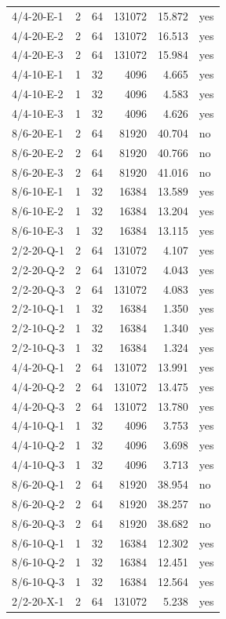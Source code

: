\begin{longtable}{lrrrrl}
4/4-20-E-1 & 2 & 64 & 131072 & 15.872 & yes \\
4/4-20-E-2 & 2 & 64 & 131072 & 16.513 & yes \\
4/4-20-E-3 & 2 & 64 & 131072 & 15.984 & yes \\
4/4-10-E-1 & 1 & 32 & 4096 & 4.665 & yes \\
4/4-10-E-2 & 1 & 32 & 4096 & 4.583 & yes \\
4/4-10-E-3 & 1 & 32 & 4096 & 4.626 & yes \\
8/6-20-E-1 & 2 & 64 & 81920 & 40.704 & no \\
8/6-20-E-2 & 2 & 64 & 81920 & 40.766 & no \\
8/6-20-E-3 & 2 & 64 & 81920 & 41.016 & no \\
8/6-10-E-1 & 1 & 32 & 16384 & 13.589 & yes \\
8/6-10-E-2 & 1 & 32 & 16384 & 13.204 & yes \\
8/6-10-E-3 & 1 & 32 & 16384 & 13.115 & yes \\
2/2-20-Q-1 & 2 & 64 & 131072 & 4.107 & yes \\
2/2-20-Q-2 & 2 & 64 & 131072 & 4.043 & yes \\
2/2-20-Q-3 & 2 & 64 & 131072 & 4.083 & yes \\
2/2-10-Q-1 & 1 & 32 & 16384 & 1.350 & yes \\
2/2-10-Q-2 & 1 & 32 & 16384 & 1.340 & yes \\
2/2-10-Q-3 & 1 & 32 & 16384 & 1.324 & yes \\
4/4-20-Q-1 & 2 & 64 & 131072 & 13.991 & yes \\
4/4-20-Q-2 & 2 & 64 & 131072 & 13.475 & yes \\
4/4-20-Q-3 & 2 & 64 & 131072 & 13.780 & yes \\
4/4-10-Q-1 & 1 & 32 & 4096 & 3.753 & yes \\
4/4-10-Q-2 & 1 & 32 & 4096 & 3.698 & yes \\
4/4-10-Q-3 & 1 & 32 & 4096 & 3.713 & yes \\
8/6-20-Q-1 & 2 & 64 & 81920 & 38.954 & no \\
8/6-20-Q-2 & 2 & 64 & 81920 & 38.257 & no \\
8/6-20-Q-3 & 2 & 64 & 81920 & 38.682 & no \\
8/6-10-Q-1 & 1 & 32 & 16384 & 12.302 & yes \\
8/6-10-Q-2 & 1 & 32 & 16384 & 12.451 & yes \\
8/6-10-Q-3 & 1 & 32 & 16384 & 12.564 & yes \\
2/2-20-X-1 & 2 & 64 & 131072 & 5.238 & yes \\

\end{longtable}
